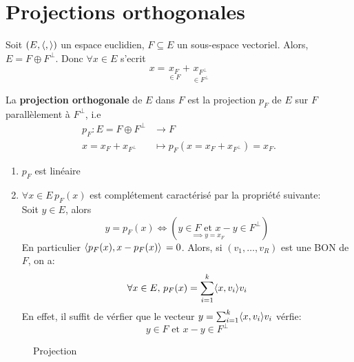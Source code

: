 \section{Projections orthogonales}
Soit $(E, \langle , \rangle)$ un espace euclidien,  $F \subseteq E$ un sous-espace vectoriel. Alors,  $E = F \oplus F^{\perp}$. Donc $\forall x \in E$ s'ecrit 
\[
x = \underset{\in F}{x_F} + \underset{\in F^{\perp}}{x_{F^{\perp}}}
\] 
\begin{definition}
    La \textbf{projection orthogonale} de $E$ dans  $F$ est la projection  $p_F$ de  $E$ sur  $F$ parallèlement  à $F^{\perp}$, i.e
    \begin{align*}
        p_F: E = F \oplus F^{\perp} &\longrightarrow F \\
        x = x_F + x_{F^{\perp}} &\longmapsto p_F(x = x_F + x_{F^{\perp}}) = x_F
    .\end{align*}
\end{definition}
\begin{remark}
   \begin{enumerate}
       \item $p_F$ est linéaire
       \item  $\forall x \in E \, p_{F}(x)$ est complétement caractérisé par la propriété suivante:\\
           Soit $y \in E$, alors
            \[
                y = p_F(x) \iff \left( \underset{\implies y = x_F}{y \in F \text{ et } x - y} \in F^{\perp} \right) 
           \] 
       En particulier $\langle p_F(x), x - p_F(x) \rangle \,= 0$. Alors, si $(v_1, \ldots, v_R)$ est une BON de $F$, on a:
            \[
                \forall x \in E, \, p_F(x) = \sum_{i=1}^{k} \langle x, v_i \rangle v_i
           \] 
           En effet, il suffit de vérfier que le vecteur $y = \sum_{i=1}^{k} \langle x, v_i \rangle v_i$ vérfie:
           \[
               y \in F \text{ et } x - y \in F^{\perp}
           \] 
   \end{enumerate} 
\end{remark}
\begin{figure}[H]
   \centering 
{}
\caption{Projection}
\label{pic:projection}
\end{figure}
